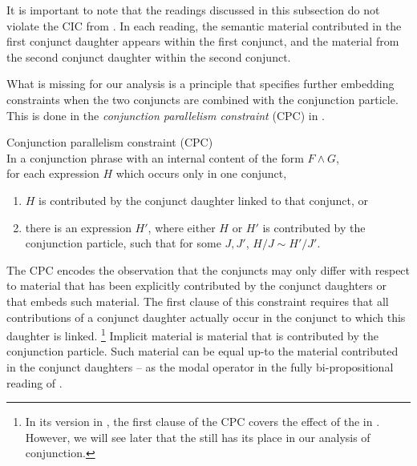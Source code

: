 \documentclass[output=paper]{langsci/langscibook}
\begin{document}
It is important to note that the readings discussed in this subsection do not violate the CIC from . 
In each reading, the semantic material contributed in the first conjunct daughter appears within the first conjunct, and the material from the second conjunct daughter within the second conjunct.

What is missing for our analysis is a principle that specifies further embedding constraints when the two conjuncts are combined with the conjunction particle. This is done in the \emph{conjunction parallelism constraint} (CPC) in .

\ea 
Conjunction parallelism constraint (CPC)\label{CPC}\\
In a conjunction phrase
with an internal content of the form $F \land G$,\\
for each expression $H$ which occurs only in one conjunct,
\begin{enumerate}
\item  $H$ is contributed by the conjunct daughter linked to that conjunct, or 
\item there is an expression $H'$, where either $H$ or $H'$ is contributed by the conjunction particle, such that for some $J, J'$,  $H/J \sim H'/J'$.
\end{enumerate}
\z


The CPC encodes the observation that the conjuncts may only differ with respect to material that has been explicitly contributed by the conjunct daughters or that embeds such material.
The first clause of this constraint requires that all contributions of a conjunct daughter actually occur in the conjunct to which this daughter is linked.%
\footnote{In its version in , the first clause of the CPC covers the effect of the \CCB{} in . 
However, we will see later that 
the \CCB{} still has its place in our analysis of conjunction.}
Implicit material is material that is contributed by the conjunction particle.
Such material can be equal up-to the material contributed in the conjunct daughters -- as the modal operator in the fully bi-propositional reading of . 
\end{document}

